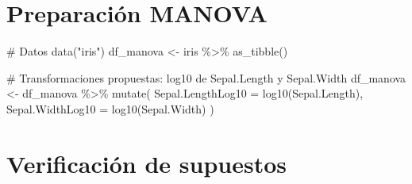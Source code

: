 \documentclass[
  spanish,
  11pt,
  a4paper,
  DIV=11,
  numbers=noendperiod]{scrartcl}
\newenvironment{Shaded}{\begin{snugshade}}{\end{snugshade}}
\newcommand{\AttributeTok}[1]{\textcolor[rgb]{0.40,0.45,0.13}{#1}}
\newcommand{\CommentTok}[1]{\textcolor[rgb]{0.37,0.37,0.37}{#1}}
\newcommand{\FunctionTok}[1]{\textcolor[rgb]{0.28,0.35,0.67}{#1}}
\newcommand{\NormalTok}[1]{\textcolor[rgb]{0.00,0.23,0.31}{#1}}
\newcommand{\OtherTok}[1]{\textcolor[rgb]{0.00,0.23,0.31}{#1}}
\newcommand{\SpecialCharTok}[1]{\textcolor[rgb]{0.37,0.37,0.37}{#1}}
\newcommand{\StringTok}[1]{\textcolor[rgb]{0.13,0.47,0.30}{#1}}
\begin{document}
\section{Preparación MANOVA}\label{preparaciuxf3n-manova}

\begin{Shaded}
\begin{Highlighting}[numbers=left,,]
\CommentTok{\# Datos}
\FunctionTok{data}\NormalTok{(}\StringTok{"iris"}\NormalTok{)}
\NormalTok{df\_manova }\OtherTok{\textless{}{-}}\NormalTok{ iris }\SpecialCharTok{\%\textgreater{}\%} \FunctionTok{as\_tibble}\NormalTok{()}

\CommentTok{\# Transformaciones propuestas: log10 de Sepal.Length y Sepal.Width}
\NormalTok{df\_manova }\OtherTok{\textless{}{-}}\NormalTok{ df\_manova }\SpecialCharTok{\%\textgreater{}\%}
  \FunctionTok{mutate}\NormalTok{(}
    \AttributeTok{Sepal.LengthLog10 =} \FunctionTok{log10}\NormalTok{(Sepal.Length),}
    \AttributeTok{Sepal.WidthLog10  =} \FunctionTok{log10}\NormalTok{(Sepal.Width)}
\NormalTok{  )}
\end{Highlighting}
\end{Shaded}

\section{Verificación de supuestos}\label{verificaciuxf3n-de-supuestos}
\end{document}
